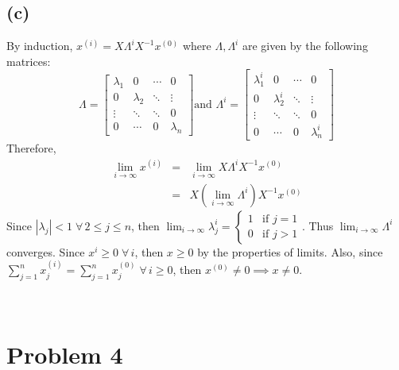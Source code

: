 \documentclass[11pt]{article}
\theoremstyle{definition}
\theoremstyle{remark}
\newcommand{\newquestion}{\hrulefill\vspace{-0.8\baselineskip}\\\null\hrulefill\vspace{-1.0\baselineskip}}
\newcommand{\newpart}{\vspace{-0.5\baselineskip}\hrulefill\vspace{-1.3\baselineskip}}
\theoremstyle{plain}
\begin{document}
\subsection*{(c)}
By induction, $x^{(i)}=X\Lambda^i X^{-1}x^{(0)}$ where $\Lambda, \Lambda^i$ are given by the following matrices:
\begin{equation*}
  \Lambda=\left[
    \begin{array}{cccc}
      \lambda_1 & 0 & \cdots & 0\\
      0 & \lambda_2 & \ddots & \vdots\\
      \vdots & \ddots & \ddots & 0\\
      0 & \cdots & 0 & \lambda_n
    \end{array}
  \right]\textrm{and }
  \Lambda^i=\left[
    \begin{array}{cccc}
      \lambda_1^i & 0 & \cdots & 0\\
      0 & \lambda_2^i & \ddots & \vdots\\
      \vdots & \ddots & \ddots & 0\\
      0 & \cdots & 0 & \lambda_n^i
    \end{array}
  \right]
\end{equation*}
Therefore,
\begin{eqnarray*}
  \lim_{i\to\infty}x^{(i)}&=&\lim_{i\to\infty}X\Lambda^iX^{-1}x^{(0)}\\
                          &=&X\left(\lim_{i\to\infty}\Lambda^i\right)X^{-1}x^{(0)}
\end{eqnarray*}
Since $\left\vert\lambda_j\right\vert<1\;\forall\,2\leq j\leq n$, then $\lim_{i\to\infty}\lambda_j^i=
\left\{\begin{array}{cr}
        1 & \textrm{if }j = 1\\
        0 & \textrm{if }j > 1
      \end{array}
    \right.$. Thus $\lim_{i\to\infty}\Lambda^i$ converges. Since $x^{i}\geq0\;\forall\,i$, then $x\geq0$ by the properties of limits. Also, since $\sum_{j=1}^nx_j^{(i)}=\sum_{j=1}^nx_j^{(0)}\;\forall\, i\geq0$, then $x^{(0)}\ne0\implies x\ne0$.

\newquestion
%
%
\section*{Problem 4}

\newpart
\end{document}
